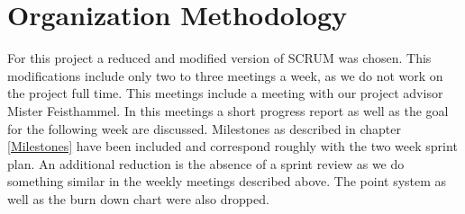 \section{Organization Methodology}
For this project a reduced and modified version of SCRUM \cite{scrum_url} was chosen. This modifications include only two to three meetings a week, as we do not work on the project full time. This meetings include a meeting with our project advisor Mister Feisthammel. In this meetings a short progress report as well as the goal for the following week are discussed. Milestones as described in chapter \ref{Milestones} have been included and correspond roughly with the two week sprint plan. An additional reduction is the absence of a sprint review as we do something similar in the weekly meetings described above. The point system as well as the burn down chart were also dropped.